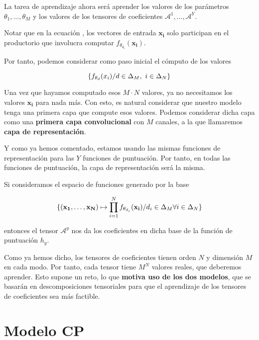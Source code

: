 La tarea de aprendizaje ahora será aprender los valores de los parámetros $\theta_1, \ldots, \theta_M$ y los valores de los tensores de coeficientes $\mathcal{A}^1, \ldots, \mathcal{A}^Y$.

\begin{observacion}
    Notar que en la ecuación , los vectores de entrada $\mathbf{x_i}$ solo participan en el productorio que involucra computar $f_{\theta_{d_i}}(\mathbf{x_i})$.

    Por tanto, podemos considerar como paso inicial el cómputo de los valores

    $$\{f_{\theta_d}(x_i) / d \in \Delta_{M},\ i \in \Delta_{N} \}$$

    Una vez que hayamos computado esos $M \cdot N$ valores, ya no necesitamos los valores $\mathbf{x_i}$ para nada más. Con esto, es natural considerar que nuestro modelo tenga una primera capa que compute esos valores. Podemos considerar dicha capa como una \textbf{primera capa convolucional} con $M$ canales, a la que llamaremos \textbf{capa de representación}.

    Y como ya hemos comentado, estamos usando las mismas funciones de representación para las $Y$ funciones de puntuación. Por tanto, en todas las funciones de puntuación, la capa de representación será la misma.
\end{observacion}

\begin{observacion}
    Si consideramos el espacio de funciones generado por la base

    $$\{(\mathbf{x_1}, \ldots, \mathbf{x_N}) \mapsto \prod_{i = 1}^{N} f_{\theta_{d_i}} (\mathbf{x_i}) / d_i \in \Delta_{M} \forall i \in \Delta_{N}\}$$

    entonces el tensor $\mathcal{A}^y$ nos da los coeficientes en dicha base de la función de puntuación $h_y$.
\end{observacion}

Como ya hemos dicho, los tensores de coeficientes tienen orden $N$ y dimensión $M$ en cada modo. Por tanto, cada tensor tiene $M^N$ valores reales, que deberemos aprender. Esto supone un reto, lo que \textbf{motiva uso de los dos modelos}, que se basarán en descomposiciones tensoriales para que el aprendizaje de los tensores de coeficientes sea más factible.

\section{Modelo CP}

